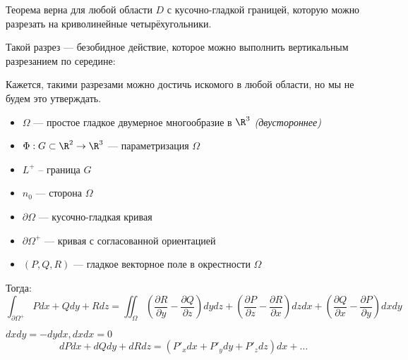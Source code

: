 \begin{remark}
    Теорема верна для любой области \(D\) с кусочно-гладкой границей, которую можно разрезать на криволинейные четырёхугольники.

    Такой разрез --- безобидное действие, которое можно выполнить вертикальным разрезанием по середине:
    \begin{figure}[h]
        
        \centering
    \end{figure}

    Кажется, такими разрезами можно достичь искомого в любой области, но мы не будем это утверждать.
\end{remark}

\begin{theorem}\itemfix
    \begin{itemize}
        \item \(\Omega\) --- простое гладкое двумерное многообразие в \(\R^3\) \textit{(двустороннее)}
        \item \(\Phi : G \subset \R^2 \to \R^3\) --- параметризация \(\Omega\)
        \item \(L^{ +}\) -- граница \(G\)
        \item \(n_0\) --- сторона \(\Omega\)
        \item \(\partial \Omega\) --- кусочно-гладкая кривая
        \item \(\partial \Omega^{ +}\) --- кривая с согласованной ориентацией
        \item \((P, Q, R)\) --- гладкое векторное поле в окрестности \(\Omega\)
    \end{itemize}

    Тогда:
    \[\int_{\partial \Omega^{ +}} P dx + Q dy + R dz = \iint_\Omega \left( \frac{\partial R}{\partial y} - \frac{\partial Q}{\partial z} \right) dy dz + \left( \frac{\partial P}{\partial z} - \frac{\partial R}{\partial x} \right) dz dx + \left( \frac{\partial Q}{\partial x} - \frac{\partial P}{\partial y} \right) dx dy\]
\end{theorem}

\begin{remark}
    \(dx dy = - dy dx, dx dx = 0\)
    \[d P dx + dQ dy + dR dz = (P'_x dx + P'_y dy + P'_z dz) dx + \dots \]
\end{remark}

